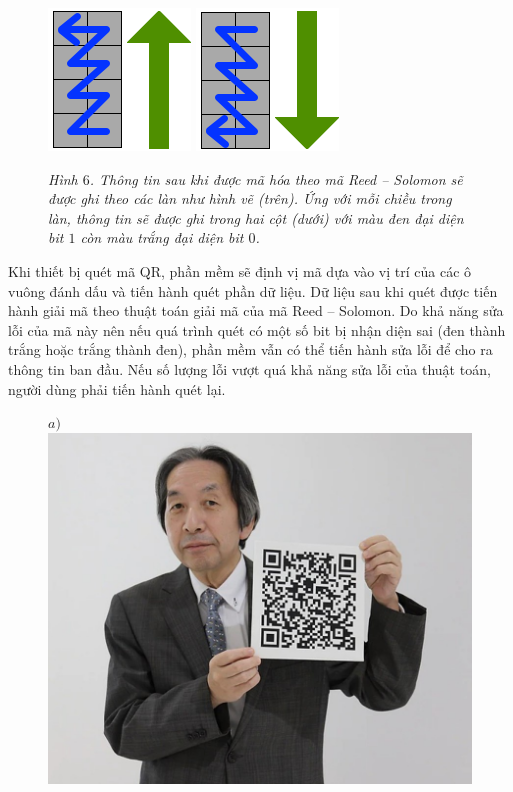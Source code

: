 \begin{multicols}{2}
\begin{figure}[H]
		\includegraphics[height=0.38\linewidth]{12}
		\includegraphics[height=0.38\linewidth]{13}
		\caption{\small\textit{\color{toanhocdoisong}Hình $6$. Thông tin sau khi được mã hóa theo mã Reed -- Solomon sẽ được ghi theo các làn như hình vẽ (trên). Ứng với mỗi chiều trong làn, thông tin sẽ được ghi trong hai cột (dưới) với màu đen đại diện bit $1$ còn màu trắng đại diện bit $0$.}}
		\vspace*{-5pt}
	\end{figure}
	Khi thiết bị quét mã QR, phần mềm sẽ định vị mã dựa vào vị trí của các ô vuông đánh dấu và tiến hành quét phần dữ liệu. Dữ liệu sau khi quét được tiến hành giải mã theo thuật toán giải mã của mã Reed -- Solomon. Do khả năng sửa lỗi của mã này nên nếu quá trình quét có một số bit bị nhận diện sai (đen thành trắng hoặc trắng thành đen), phần mềm vẫn có thể tiến hành sửa lỗi để cho ra thông tin ban đầu. Nếu số lượng lỗi vượt quá khả năng sửa lỗi của thuật toán, người dùng phải tiến hành quét lại.
	\begin{figure}[H]
		\vspace*{-5pt}
		\centering
		\captionsetup{labelformat= empty, justification=centering}
		$a)$\includegraphics[width= 0.95\linewidth]{14}

\end{figure}
\end{multicols}
